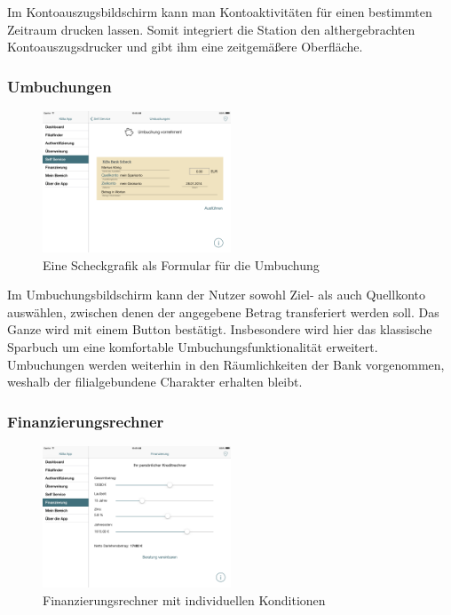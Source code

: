 	Im Kontoauszugsbildschirm kann man Kontoaktivitäten für einen bestimmten Zeitraum drucken lassen. Somit integriert die Station den althergebrachten Kontoauszugsdrucker und gibt ihm eine zeitgemäßere Oberfläche.

\subsubsection{Umbuchungen}
\begin{figure}[h]
	\centering
  \includegraphics[width=0.5\textwidth]{Pictures/umbuchung}
	\caption{Eine Scheckgrafik als Formular für die Umbuchung}
	\label{fig8}
\end{figure}

	Im Umbuchungsbildschirm kann der Nutzer sowohl Ziel- als auch Quellkonto auswählen, zwischen denen der angegebene Betrag transferiert werden soll. Das Ganze wird mit einem Button bestätigt. Insbesondere wird hier das klassische Sparbuch um eine komfortable Umbuchungsfunktionalität erweitert. Umbuchungen werden weiterhin in den Räumlichkeiten der Bank vorgenommen, weshalb der filialgebundene Charakter erhalten bleibt.
\pagebreak
\subsubsection{Finanzierungsrechner}
\begin{figure}[h]
	\centering
  \includegraphics[width=0.5\textwidth]{Pictures/finanzierung}
	\caption{Finanzierungsrechner mit individuellen Konditionen}
	\label{fig9}
\end{figure}

